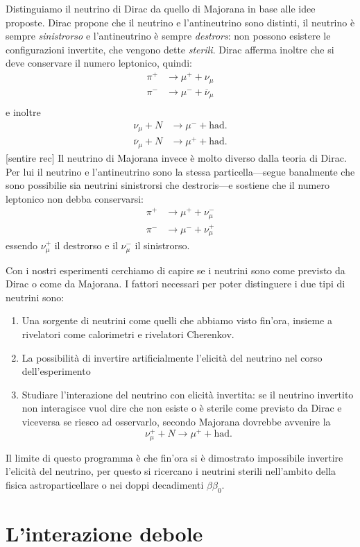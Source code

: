             Distinguiamo il neutrino di Dirac da quello di Majorana in base alle idee proposte. Dirac propone che il neutrino e l'antineutrino sono distinti, il neutrino è sempre \emph{sinistrorso} e l'antineutrino è sempre \emph{destrors}: non possono esistere le configurazioni invertite, che vengono dette \emph{sterili}. Dirac afferma inoltre che si deve conservare il numero leptonico, quindi:
            \begin{align*}
                \pi^+ &\rightarrow \mu^+ + \nu_\mu\\
                \pi^- &\rightarrow \mu^- + \overline{\nu}_\mu\\
            \end{align*}
            e inoltre
            \begin{align*}
                \nu_\mu + N &\rightarrow \mu^- + \text{had.}\\
                \overline{\nu}_\mu + N &\rightarrow \mu^+ + \text{had.}
            \end{align*}
            [sentire rec]
            Il neutrino di Majorana invece è molto diverso dalla teoria di Dirac. Per lui il neutrino e l'antineutrino sono la stessa particella---segue banalmente che sono possibilie sia neutrini sinistrorsi che destroris---e sostiene che il numero leptonico non debba conservarsi:
            \begin{align*}
                \pi^+ &\rightarrow \mu^+ + \nu_\mu^-\\
                \pi^- &\rightarrow \mu^- + \nu_\mu^+
            \end{align*}
            essendo $\nu_\mu^+$ il destrorso e il $\nu_\mu^-$ il sinistrorso.

            Con i nostri esperimenti cerchiamo di capire se i neutrini sono come previsto da Dirac o come da Majorana. I fattori necessari per poter distinguere i due tipi di neutrini sono:
            \begin{enumerate}
                \item Una sorgente di neutrini come quelli che abbiamo visto fin'ora, insieme a rivelatori come calorimetri e rivelatori Cherenkov.
                \item La possibilità di invertire artificialmente l'elicità del neutrino nel corso dell'esperimento
                \item Studiare l'interazione del neutrino con elicità invertita: se il neutrino invertito non interagisce vuol dire che non esiste o è sterile come previsto da Dirac e viceversa se riesco ad osservarlo, secondo Majorana dovrebbe avvenire la
                \begin{equation}
                    \nu_\mu^+ + N \rightarrow \mu^+ + \text{had.}
                \end{equation}
            \end{enumerate}
            Il limite di questo programma è che fin'ora si è dimostrato impossibile invertire l'elicità del neutrino, per questo si ricercano i neutrini sterili nell'ambito della fisica astroparticellare o nei doppi decadimenti $\beta\beta_0$.
    \section{L'interazione debole}
